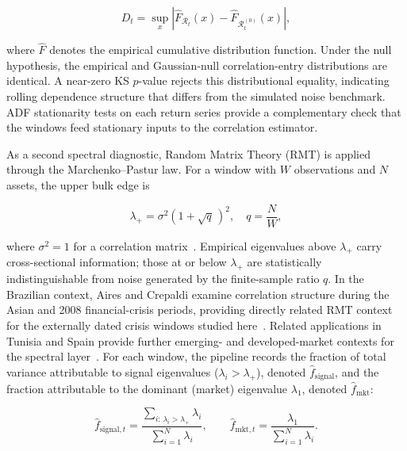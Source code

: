 \documentclass[a4paper,fleqn,review]{cas-sc}
\begin{document}
\begin{equation}
\label{eq:ks_statistic}
D_t = \sup_x \left| \widehat{F}_{\mathcal{R}_t}(x) - \widehat{F}_{\mathcal{R}^{(0)}_t}(x) \right|,
\end{equation}

\noindent where $\widehat{F}$ denotes the empirical cumulative distribution function. Under the null hypothesis, the empirical and Gaussian-null correlation-entry distributions are identical. A near-zero KS $p$-value rejects this distributional equality, indicating rolling dependence structure that differs from the simulated noise benchmark. ADF stationarity tests on each return series provide a complementary check that the windows feed stationary inputs to the correlation estimator.

As a second spectral diagnostic, Random Matrix Theory (RMT) is applied through the Marchenko--Pastur law. For a window with $W$ observations and $N$ assets, the upper bulk edge is

\begin{equation}
\label{eq:mp_upper}
\lambda_+ = \sigma^2 \!\left(1 + \sqrt{q}\,\right)^2, \quad q = \frac{N}{W},
\end{equation}

\noindent where $\sigma^2 = 1$ for a correlation matrix~\citep{marchenko1967,laloux1999noise,plerou2002random}. Empirical eigenvalues above $\lambda_+$ carry cross-sectional information; those at or below $\lambda_+$ are statistically indistinguishable from noise generated by the finite-sample ratio $q$. In the Brazilian context, Aires and Crepaldi examine correlation structure during the Asian and 2008 financial-crisis periods, providing directly related RMT context for the externally dated crisis windows studied here~\citep{aires2022brazilrmt}. Related applications in Tunisia and Spain provide further emerging- and developed-market contexts for the spectral layer~\citep{benyaala2025tunisiarmt,dominguezmonterroza2025spanishrmt}. For each window, the pipeline records the fraction of total variance attributable to signal eigenvalues ($\lambda_i > \lambda_+$), denoted $\widehat{f}_{\text{signal}}$, and the fraction attributable to the dominant (market) eigenvalue $\lambda_1$, denoted $\widehat{f}_{\text{mkt}}$:

\begin{equation}
\label{eq:mp_signal_frac}
\widehat{f}_{\text{signal},t}=\frac{\sum_{i:\,\lambda_i>\lambda_+}\lambda_i}{\sum_{i=1}^N \lambda_i},
\qquad
\widehat{f}_{\text{mkt},t}=\frac{\lambda_1}{\sum_{i=1}^N \lambda_i}.
\end{equation}
\end{document}
